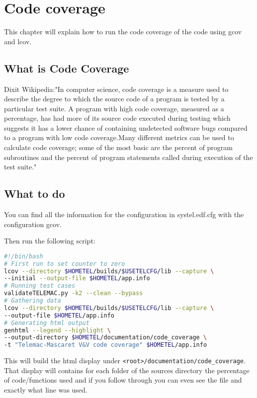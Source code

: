 %
\chapter{Code coverage}
%
This chapter will explain how to run the code coverage of the code using gcov and lcov.
%
%
\section{What is Code Coverage}
%
%
Dixit Wikipedia:"In computer science, code coverage is a measure used to
describe the degree to which the source code of a program is tested by a
particular test suite. A program with high code coverage, measured as a
percentage, has had more of its source code executed during testing which
suggests it has a lower chance of containing undetected software bugs compared
to a program with low code coverage.Many different metrics can be used to
calculate code coverage; some of the most basic are the percent of program
subroutines and the percent of program statements called during execution of
the test suite."
%
%
\section{What to do}
%
%
You can find all the information for the configuration in systel.edf.cfg with
the configuration gcov.

Then run the following script:
\begin{lstlisting}[language=bash]
#!/bin/bash
# First run to set counter to zero
lcov --directory $HOMETEL/builds/$USETELCFG/lib --capture \
--initial --output-file $HOMETEL/app.info
# Running test cases
validateTELEMAC.py -k2 --clean --bypass
# Gathering data
lcov --directory $HOMETEL/builds/$USETELCFG/lib --capture \
--output-file $HOMETEL/app.info
# Generating html output
genhtml --legend --highlight \
--output-directory $HOMETEL/documentation/code_coverage \
-t "Telemac-Mascaret V&V code coverage" $HOMETEL/app.info
\end{lstlisting}

This will build the html display under
\verb!<root>/documentation/code_coverage!. That display will contains for each
folder of the sources directory the percentage of code/functions used and if
you follow through you can even see the file and exactly what line was used.

